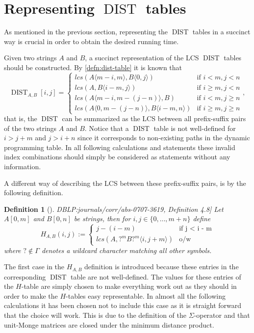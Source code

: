 \documentclass[twoside,11pt,openright]{report}
\newcommand{\DIST}{\operatorname{DIST}}
\newcommand{\substr}[3]{#1\langle #2, #3 \rangle}
\newcommand{\str}[3]{#1[#2, #3]}
\newcommand{\refbook}[2]{\cite[#1]{DBLP:journals/corr/abs-0707-3619}, #2}
\newtheorem{mydef}{Definition}
\begin{document}
\section{Representing $\DIST$ tables}
As mentioned in the previous section, representing the $\DIST$ tables in a succinct way is crucial in order to obtain the desired running time.

Given two strings $A$ and $B$, a succinct representation of the LCS $\DIST$ tables should be constructed. By \cref{defn:dist-table} it is known that
\[
  \DIST_{A,B}[i, j] = \left\{
    \begin{array}{ll}
      lcs(\substr{A}{m - i}{m}, \substr{B}{0}{j})             & \text{if } i < m, j < n \\
      lcs(A, \substr{B}{i - m}{j})                            & \text{if } i \geq m, j < n \\
      lcs(\substr{A}{m - i}{m - (j - n)}, B)                  & \text{if } i < m, j \geq n \\
      lcs(\substr{A}{0}{m - (j - n)}, \substr{B}{i - m}{n})   & \text{if } i \geq m, j \geq n
    \end{array}
  \right. ,
\]
that is, the $\DIST$ can be summarized as the LCS between all prefix-suffix pairs of the two strings $A$ and $B$.
Notice that a $\DIST$ table is not well-defined for $i > j + m$ and $j > i + n$ since it corresponds to non-existing paths in the dynamic programming table. In all following calculations and statements these invalid index combinations should simply be considered as statements without any information.

A different way of describing the LCS between these prefix-suffix pairs, is by the following definition.

\begin{mydef}[\refbook{p.-48}{Definition 4.8}]
  \label{def:H-table}
  Let $\str{A}{0}{m}$ and $\str{B}{0}{n}$ be strings, then for $i, j \in \{ 0, \dots, m + n \}$ define
  \[
    H_{A,B}(i, j) := \begin{cases}
                        j - (i - m)                         & \text{if j < i - m} \\
                        lcs(A, \substr{?^mB?^m}{i}{j + m})  & \text{o/w}
                      \end{cases}
  \]
  where $? \not\in \Gamma$ denotes a wildcard character matching all other symbols.
\end{mydef}
The first case in the $H_{A,B}$ definition is introduced because these entries in the corresponding $\DIST$ table are not well-defined. The values for these entries of the $H$-table are simply chosen to make everything work out as they should in order to make the $H$-tables easy representable. In almost all the following calculations it has been chosen not to include this case as it is straight forward that the choice will work. This is due to the definition of the $\Sigma$-operator and that unit-Monge matrices are closed under the minimum distance product.
\end{document}
